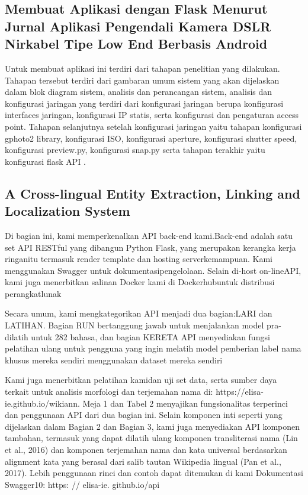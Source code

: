 \subsection{Membuat Aplikasi dengan Flask Menurut Jurnal Aplikasi Pengendali Kamera DSLR Nirkabel Tipe Low End Berbasis Android}
Untuk membuat aplikasi ini terdiri dari tahapan penelitian yang dilakukan. Tahapan tersebut terdiri dari gambaran umum sistem yang akan dijelaskan dalam blok diagram sistem, analisis dan perancangan sistem, analisis dan konfigurasi jaringan yang terdiri dari konfigurasi jaringan berupa konfigurasi interfaces jaringan, konfigurasi IP statis, serta konfigurasi dan pengaturan access point. Tahapan selanjutnya setelah konfigurasi jaringan yaitu tahapan konfigurasi gphoto2 library, konfigurasi ISO, konfigurasi aperture, konfigurasi shutter speed, konfigurasi preview.py, konfigurasi snap.py serta tahapan terakhir yaitu konfigurasi flask API \cite{computingaplikasi}.


\subsection{A Cross-lingual Entity Extraction, Linking and Localization System}
Di bagian ini, kami memperkenalkan API back-end kami.Back-end adalah satu set API RESTful yang dibangun Python Flask, yang merupakan kerangka kerja ringanitu termasuk render template dan hosting serverkemampuan. Kami menggunakan Swagger untuk dokumentasipengelolaan. Selain di-host on-lineAPI, kami juga menerbitkan salinan Docker kami di Dockerhubuntuk distribusi perangkatlunak

Secara umum, kami mengkategorikan API menjadi dua bagian:LARI dan LATIHAN. Bagian RUN bertanggung jawab untuk menjalankan model pra-dilatih untuk 282 bahasa, dan bagian KERETA API menyediakan fungsi pelatihan ulang untuk pengguna yang ingin melatih model pemberian label nama khusus mereka sendiri menggunakan dataset mereka sendiri

Kami juga menerbitkan pelatihan kamidan uji set data, serta sumber daya terkait untuk analisis morfologi dan terjemahan nama di: https://elisa-ie.github.io/wikiann. Meja 1 dan Tabel 2 menyajikan fungsionalitas terperinci dan penggunaan API dari dua bagian ini. Selain komponen inti seperti yang dijelaskan dalam Bagian 2 dan Bagian 3, kami juga menyediakan API komponen tambahan, termasuk yang dapat dilatih ulang komponen transliterasi nama (Lin et al., 2016) dan komponen terjemahan nama dan kata universal berdasarkan alignment kata yang berasal dari salib tautan Wikipedia lingual (Pan et al., 2017). Lebih penggunaan rinci dan contoh dapat ditemukan di kami Dokumentasi Swagger10: https: // elisa-ie. github.io/api 

